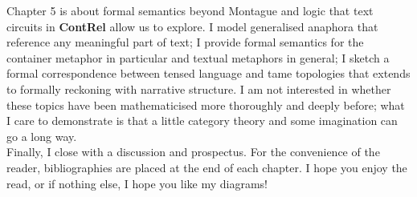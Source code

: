 Chapter 5 is about formal semantics beyond Montague and logic that text circuits in \textbf{ContRel} allow us to explore. I model generalised anaphora that reference any meaningful part of text; I provide formal semantics for the container metaphor in particular and textual metaphors in general; I sketch a formal correspondence between tensed language and tame topologies that extends to formally reckoning with narrative structure. I am not interested in whether these topics have been mathematicised more thoroughly and deeply before; what I care to demonstrate is that a little category theory and some imagination can go a long way.\\

Finally, I close with a discussion and prospectus. For the convenience of the reader, bibliographies are placed at the end of each chapter. I hope you enjoy the read, or if nothing else, I hope you like my diagrams!
